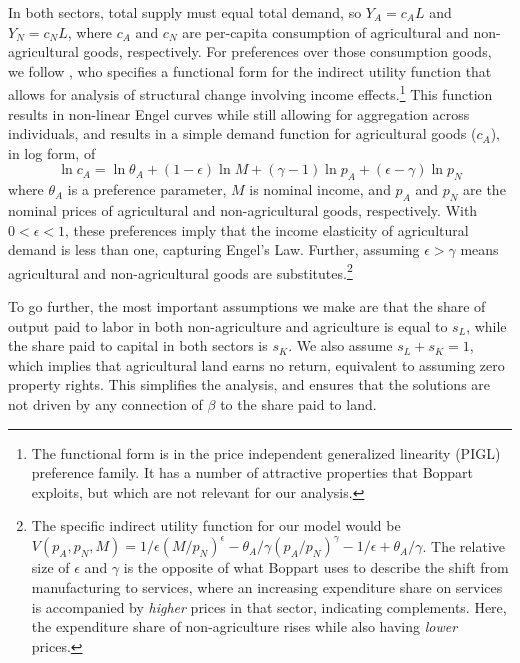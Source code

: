 \documentclass[11pt]{article}
\begin{document}
In both sectors, total supply must equal total demand, so $Y_A = c_A L$ and $Y_N = c_N L$, where $c_A$ and $c_N$ are per-capita consumption of agricultural and non-agricultural goods, respectively. For preferences over those consumption goods, we follow \cite{boppart2014}, who specifies a functional form for the indirect utility function that allows for analysis of structural change involving income effects.\footnote{The functional form is in the price independent generalized linearity (PIGL) preference family. It has a number of attractive properties that Boppart exploits, but which are not relevant for our analysis.} This function results in non-linear Engel curves while still allowing for aggregation across individuals, and results in a simple demand function for agricultural goods ($c_A$), in log form, of
\begin{equation}
    \ln c_A = \ln \theta_A + (1-\epsilon) \ln M + (\gamma - 1) \ln p_A + (\epsilon - \gamma) \ln p_N \label{EQ_ca_demand}
\end{equation}
where $\theta_A$ is a preference parameter, $M$ is nominal income, and $p_A$ and $p_N$ are the nominal prices of agricultural and non-agricultural goods, respectively. With $0 < \epsilon < 1$, these preferences imply that the income elasticity of agricultural demand is less than one, capturing Engel's Law. Further, assuming $\epsilon > \gamma$ means agricultural and non-agricultural goods are substitutes.\footnote{The specific indirect utility function for our model would be $V(p_A,p_N,M) = 1/\epsilon \left(M/p_N\right)^{\epsilon} - \theta_A/\gamma \left(p_A/p_N\right)^{\gamma} - 1/\epsilon + \theta_A/\gamma$. The relative size of $\epsilon$ and $\gamma$ is the opposite of what Boppart uses to describe the shift from manufacturing to services, where an increasing expenditure share on services is accompanied by \textit{higher} prices in that sector, indicating complements. Here, the expenditure share of non-agriculture rises while also having \textit{lower} prices.}

To go further, the most important assumptions we make are that the share of output paid to labor in both non-agriculture and agriculture is equal to $s_L$, while the share paid to capital in both sectors is $s_K$. We also assume $s_L + s_K = 1$, which implies that agricultural land earns no return, equivalent to assuming zero property rights. This simplifies the analysis, and ensures that the solutions are not driven by any connection of $\beta$ to the share paid to land. 
\end{document}
